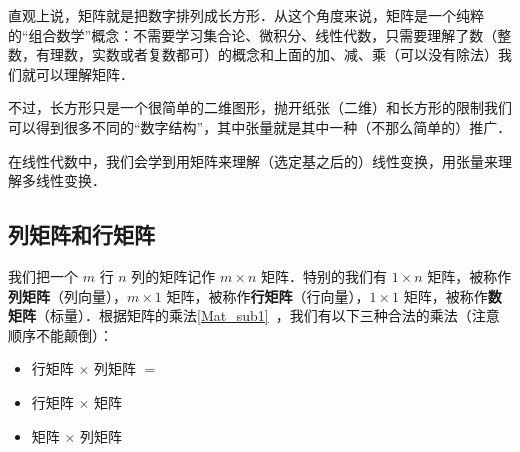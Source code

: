 


直观上说，矩阵就是把数字排列成长方形．从这个角度来说，矩阵是一个纯粹的“组合数学”概念：不需要学习集合论、微积分、线性代数，只需要理解了数（整数，有理数，实数或者复数都可）的概念和上面的加、减、乘（可以没有除法）我们就可以理解矩阵．

不过，长方形只是一个很简单的二维图形，抛开纸张（二维）和长方形的限制我们可以得到很多不同的“数字结构”，其中张量就是其中一种（不那么简单的）推广．

在线性代数中，我们会学到用矩阵来理解（选定基之后的）线性变换，用张量来理解多线性变换．

\subsection{列矩阵和行矩阵}
我们把一个 $m$ 行 $n$ 列的矩阵记作 $m \times n$ 矩阵．特别的我们有 $1 \times n$ 矩阵，被称作\textbf{列矩阵}（列向量），$m \times 1$ 矩阵，被称作\textbf{行矩阵}（行向量），$1 \times 1$ 矩阵，被称作\textbf{数矩阵}（标量）．根据矩阵的乘法\autoref{Mat_sub1}~，我们有以下三种合法的乘法（注意顺序不能颠倒）：

\begin{itemize}
\item 行矩阵 $\times$ 列矩阵 $=$
\item 行矩阵 $\times$ 矩阵
\item 矩阵 $\times$ 列矩阵
\end{itemize}






